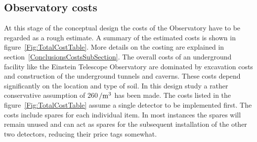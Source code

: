 \subsection{Observatory costs}
At this stage of the conceptual design the costs of the Observatory have to be regarded 
as a rough estimate. A summary of the estimated costs is shown in 
figure~\ref{Fig:TotalCostTable}. More details on the costing are explained in 
section~\ref{ConclusionsCostsSubSection}. 
The overall costs of an underground facility like the Einstein Telescope Observatory 
are dominated by excavation costs and construction of the underground tunnels and 
caverns. These costs depend significantly on the location and type of soil. In this 
design study a rather conservative assumption of 260\,\texteuro$\rm{/m^3}$  has been 
made. The costs listed in the figure~\ref{Fig:TotalCostTable} assume a single detector 
to be implemented first. The costs include spares for each individual item. In most 
instances the spares will remain unused and can act as spares for the subsequent 
installation of the other two detectors, reducing their price tags somewhat.
